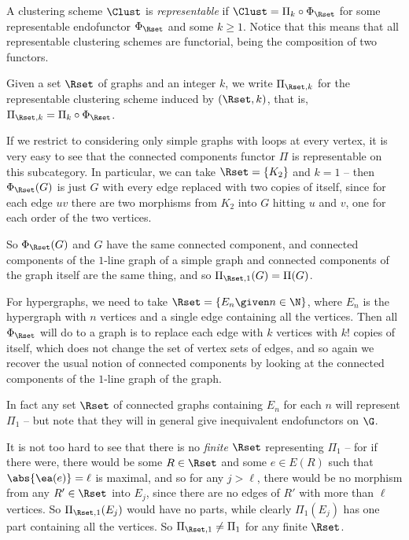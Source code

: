 \documentclass[a4paper,reqno,oneside]{article} %
\begin{document}
\begin{definition}\label{definition_representable_clustscheme}
    A clustering scheme $\Clust$ is \emph{representable} if $\Clust = \Pi_k \circ \Phi_\Rset$ for some representable endofunctor $\Phi_\Rset$ and some $k \geq 1$. Notice that this means that all representable clustering schemes are functorial, being the composition of two functors.

    Given a set $\Rset$ of graphs and an integer $k$, we write $\Pi_{\Rset,k}$ for the representable clustering scheme induced by $(\Rset,k)$, that is, $\Pi_{\Rset,k} = \Pi_k \circ \Phi_\Rset$.
\end{definition}

\begin{example}
    If we restrict to considering only simple graphs with loops at every vertex, it is very easy to see that the connected components functor $\Pi$ is representable on this subcategory. In particular, we can take $\Rset = \{K_2\}$ and $k = 1$ -- then $\Phi_\Rset(G)$ is just $G$ with every edge replaced with two copies of itself, since for each edge $uv$ there are two morphisms from $K_2$ into $G$ hitting $u$ and $v$, one for each order of the two vertices.
    
    So $\Phi_\Rset(G)$ and $G$ have the same connected component, and connected components of the $1$-line graph of a simple graph and connected components of the graph itself are the same thing, and so $\Pi_{\Rset,1}(G) = \Pi(G)$.
    
    For hypergraphs, we need to take $\Rset = \left\{E_n \given n \in \N\right\}$, where $E_n$ is the hypergraph with $n$ vertices and a single edge containing all the vertices. Then all $\Phi_\Rset$ will do to a graph is to replace each edge with $k$ vertices with $k!$ copies of itself, which does not change the set of vertex sets of edges, and so again we recover the usual notion of connected components by looking at the connected components of the $1$-line graph of the graph.
    
    In fact any set $\Rset$ of connected graphs containing $E_n$ for each $n$ will represent $\Pi_1$ -- but note that they will in general give inequivalent endofunctors on $\G$.
\end{example}

It is not too hard to see that there is no \emph{finite} $\Rset$ representing $\Pi_1$ -- for if there were, there would be some $R \in \Rset$ and some $e \in E(R)$ such that $\abs{\ea(e)} = \ell$ is maximal, and so for any $j > \ell$, there would be no morphism from any $R' \in \Rset$ into $E_j$, since there are no edges of $R'$ with more than $\ell$ vertices. So $\Pi_{\Rset,1}(E_j)$ would have no parts, while clearly $\Pi_1(E_j)$ has one part containing all the vertices. So $\Pi_{\Rset,1} \neq \Pi_1$ for any finite $\Rset$.
\end{document}
